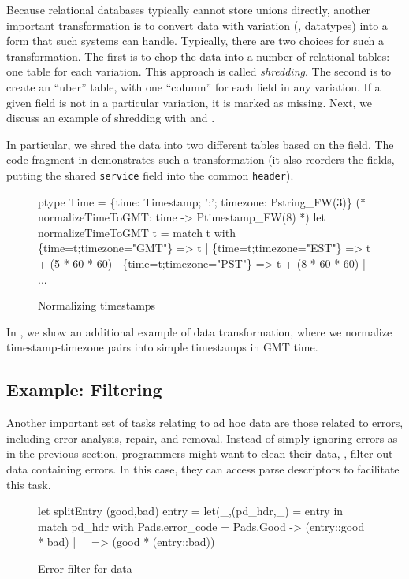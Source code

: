 Because relational databases typically cannot store unions directly,
another important transformation is to convert data with variation
(\ie{}, datatypes) into a form that such systems can handle.
Typically, there are two choices for such a transformation.  The first
is to chop the data into a number of relational tables: one table for
each variation.  This approach is called \textit{shredding}. The
second is to create an ``uber'' table, with one ``column'' for each
field in any variation.  If a given field is not in a particular
variation, it is marked as missing. Next, we discuss an example of
shredding with \padsml{} and \ocaml{}.

In particular, we shred the data into two different tables based on
the  field.  The code fragment in
 demonstrates such a transformation (it
also reorders the fields, putting the shared \texttt{service} field
into the common \texttt{header}).

\begin{figure}
  \centering
  \begin{code}
ptype Time = 
  \{time: Timestamp;
   ':'; timezone: Pstring_FW(3)\}
\mbox{}
(* normalizeTimeToGMT: time -> Ptimestamp_FW(8) *)
let normalizeTimeToGMT t = 
    match t with
      \{time=t;timezone="GMT"\} => t
    | \{time=t;timezone="EST"\} => t + (5 * 60 * 60)
    | \{time=t;timezone="PST"\} => t + (8 * 60 * 60)
    | ...    
  \end{code}
  \caption{Normalizing timestamps}
  \label{fig:ex-normalize}
\end{figure}

In , we show an additional example of data
transformation, where we normalize timestamp-timezone pairs into
simple timestamps in GMT time.

\subsection{Example: Filtering}
\label{sec:ex-filter}

Another important set of tasks relating to ad hoc data are those
related to errors, including error analysis, repair, and removal.
Instead of simply ignoring errors as in the previous section,
programmers might want to clean their data, \ie{}, filter out data
containing errors. In this case, they can access parse descriptors to
facilitate this task.

\begin{figure}
\begin{code}
let splitEntry (good,bad) entry =
  let(\_,(pd\_hdr,\_) = entry in
    match pd\_hdr with
      {Pads.error_code = Pads.Good} -> (entry::good * bad)
    | _ => (good * (entry::bad))
\end{code}
\caption{Error filter for \dibbler{} data}
\label{fig:ex-data-clean}
\end{figure}

